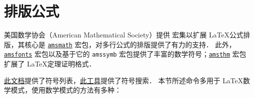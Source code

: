 \documentclass{ctexbook}
\begin{document}
\newpage
\layout


\newpage
\section{排版公式}

美国数学协会（American Mathematical Society）提供  \AmS 宏集以扩展 \LaTeX 公式排版，其核心是 \href{https://ctan.org/pkg/amsmath}{\texttt{amsmath}} 宏包，对多行公式的排版提供了有力的支持．
此外，\href{https://ctan.org/pkg/amsfonts}{\texttt{amsfonts}} 宏包以及基于它的 \verb|amssymb| 宏包提供了丰富的数学符号；\href{https://ctan.org/pkg/amsthm}{\texttt{amsthm}} 宏包扩展了 \LaTeX 定理证明格式．

\href{https://ctan.org/tex-archive/info/symbols/comprehensive/}{此文档}提供了符号列表，\href{http://detexify.kirelabs.org/classify.html}{此工具}提供了符号搜索．
本节所述命令多用于 \LaTeX 数学模式，使用数学模式的方法有多种：
\end{document}
